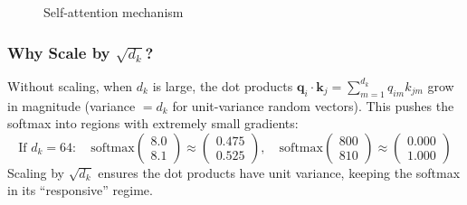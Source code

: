 \begin{figure}[htbp]
    \centering
    \caption{Self-attention mechanism}
    \label{fig:self_attention}
\end{figure}

\subsubsection{Why Scale by \texorpdfstring{$\sqrt{d_k}$}{sqrt(d_k)}?}

Without scaling, when $d_k$ is large, the dot products $\mathbf{q}_i \cdot \mathbf{k}_j = \sum_{m=1}^{d_k} q_{im} k_{jm}$ grow in magnitude (variance $= d_k$ for unit-variance random vectors). This pushes the softmax into regions with extremely small gradients:
\begin{equation}
\text{If } d_k = 64: \quad \text{softmax}\begin{pmatrix} 8.0 \\ 8.1 \end{pmatrix} \approx \begin{pmatrix} 0.475 \\ 0.525 \end{pmatrix}, \quad \text{softmax}\begin{pmatrix} 800 \\ 810 \end{pmatrix} \approx \begin{pmatrix} 0.000 \\ 1.000 \end{pmatrix}
\end{equation}
Scaling by $\sqrt{d_k}$ ensures the dot products have unit variance, keeping the softmax in its ``responsive'' regime.

